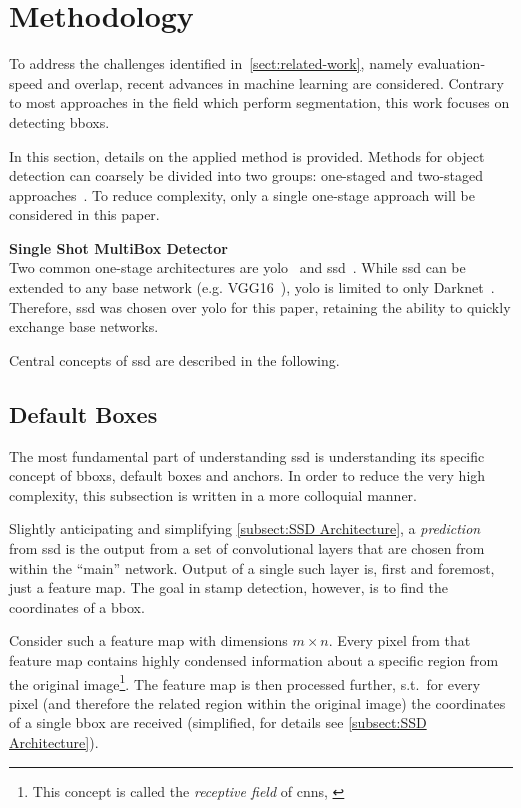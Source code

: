\section{Methodology}\label{sect:methodology}
To address the challenges identified in~\cref{sect:related-work}, namely
evaluation-speed and overlap, recent advances in machine learning are considered.
Contrary to most approaches in the field which perform segmentation, this work
focuses on detecting \glspl{bbox}.

In this section, details on the applied method is provided. Methods for object
detection can coarsely be divided into two groups: one-staged and two-staged
approaches~\cite[cf.][]{Liu.2020}. To reduce complexity, only a single one-stage approach will be
considered in this paper.

\bigskip
{\large{\textbf{Single Shot MultiBox Detector}}}\\
Two common one-stage architectures are
\gls{yolo}~\cite{Redmon.2015, Redmon.2016b, Redmon.2018} and
\gls{ssd}~\cite{Liu.2016}. While \gls{ssd} can be extended to any base network
(e.g. VGG16~\cite{Simonyan.2015}), \gls{yolo} is limited to only Darknet~\cite{Redmon.2016}.
Therefore, \gls{ssd} was chosen over \gls{yolo} for this paper, retaining the
ability to quickly exchange base networks.

Central concepts of \gls{ssd} are described in the following.

\subsection{Default Boxes}\label{subsect:default-boxes}
The most fundamental part of understanding \gls{ssd} is understanding its specific
concept of \glspl{bbox}, default boxes and anchors. In order to reduce the very high
complexity, this subsection is written in a more colloquial manner.

Slightly anticipating and simplifying \cref{subsect:SSD Architecture}, a
\emph{prediction} from \gls{ssd} is the output from a set of \glspl{convolutional layer}
that are chosen from within the ``main'' network. Output of a single such layer is,
first and foremost, just a \gls{feature map}. The goal in stamp detection, however,
is to find the coordinates of a \gls{bbox}.

Consider such a \gls{feature map} with dimensions \(m \times n\). Every pixel
from that \gls{feature map} contains highly condensed information about a specific
region from the original image\footnote{This concept is called the
\emph{receptive field} of \glspl{cnn}, \cite[cf.][331\psq]{Goodfellow.2016}}.
The \gls{feature map} is then processed further, s.t.\ for every pixel
(and therefore the related region within the original image) the coordinates of
a single \gls{bbox} are received (simplified, for details see \cref{subsect:SSD Architecture}).

